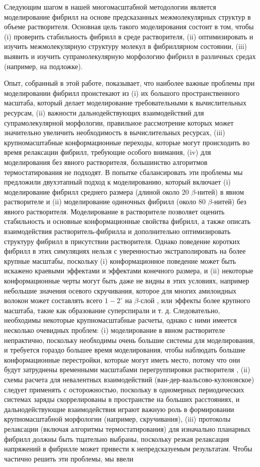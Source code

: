     
    Следующим шагом в нашей многомасштабной методологии является моделирование фибрилл на основе предсказанных межмолекулярных структур в объеме растворителя. Основная цель такого моделирования состоит в том, чтобы (i) проверить стабильность фибрилл в среде растворителя, (ii) оптимизировать и изучить межмолекулярную структуру молекул в фибриллярном состоянии, (iii) выявить и изучить супрамолекулярную морфологию фибрилл в различных средах (например, на подложке).
    
    Опыт, собранный в этой работе, показывает, что наиболее важные проблемы при моделировании фибрилл проистекают из (i) их большого пространственного масштаба, который делает моделирование требовательными к вычислительных ресурсам, (ii) важности дальнодействующих взаимодействий для супрамолекулярной морфологии, правильное рассмотрение которых может значительно увеличить необходимость в вычислительных ресурсах, (iii) крупномасштабные конформационные переходы, которые могут происходить во время релаксации фибрилл, требующие особого внимания, (iv) для моделирования без явного растворителя, большинство алгоритмов термостатирования не подходят. В попытке сбалансировать эти проблемы мы предложили двухэтапный подход к моделированию, который включает (i) моделирование фибрилл среднего размера (длиной около 20 $\beta$-нитей) в явном растворителе и (ii) моделирование одиночных фибрилл (около 80 $\beta$-нитей) без явного растворителя. Моделирование в растворителе позволяет оценить стабильность и основные конформационные свойства фибрилл, а также описать взаимодействия растворитель-фибрилла и дополнительно оптимизировать структуру фибрилл в присутствии растворителя. Однако поведение коротких фибрилл в этих симуляциях нельзя с уверенностью экстраполировать на более крупные масштабы, поскольку (i) конформационное поведение может быть искажено краевыми эффектами и эффектами конечного размера, и (ii) некоторые конформационные черты могут быть даже не видны в этих условиях, например небольшие значения осевого скручивания, которое для многих амилоидных волокон может составлять всего $1-2^{\circ}$ на $\beta$-слой \cite{paravastu_molecular_2008}, или эффекты более крупного масштаба, такие как образование суперспирали и т. д. Следовательно, необходимы некоторые крупномасштабные расчеты, однако с ними имеется несколько очевидных проблем: (i) моделирование в явном растворителе непрактично, поскольку необходимы очень большие системы для моделирования, и требуется гораздо большее время моделирования, чтобы наблюдать большие конформационные перестройки, которые могут иметь место, потому что они будут затруднены временными масштабами перегруппировки растворителя , (ii) схемы расчета для невалентных взаимодействий (ван-дер-ваальсово-кулоновское) следует применять с осторожностью, поскольку в одномерных периодических системах заряды скоррелированы в пространстве на больших расстояниях, и дальнодействующие взаимодействия играют важную роль в формировании крупномасштабной морфологии (например, скручивания), (iii) протоколы релаксации (включая алгоритмы термостатирования) для изначально планарных фибрилл должны быть тщательно выбраны, поскольку резкая релаксация напряжений в фибрилле может привести к непредсказуемым результатам. Чтобы частично решить эти проблемы, мы ввели 